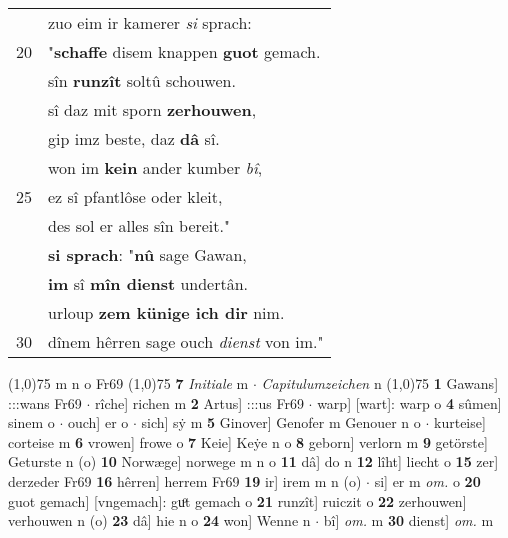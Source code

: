 \documentclass[8pt,a4paper,notitlepage]{article}
\begin{document}
\begin{table}[ht]
\begin{minipage}[t]{0.5\linewidth}
\begin{tabular}{rl}
 & zuo eim ir kamerer \textit{si} sprach:\\ 
20 & "\textbf{schaffe} disem knappen \textbf{guot} gemach.\\ 
 & sîn \textbf{runzît} soltû schouwen.\\ 
 & sî daz mit sporn \textbf{zerhouwen},\\ 
 & gip imz beste, daz \textbf{dâ} sî.\\ 
 & won im \textbf{kein} ander kumber \textit{bî},\\ 
25 & ez sî pfantlôse oder kleit,\\ 
 & des sol er alles sîn bereit."\\ 
 & \textbf{si sprach}: "\textbf{nû} sage Gawan,\\ 
 & \textbf{im} sî \textbf{mîn dienst} undertân.\\ 
 & urloup \textbf{zem künige ich dir} nim.\\ 
30 & dînem hêrren sage ouch \textit{dienst} von im."\\ 
\end{tabular}
\scriptsize
\line(1,0){75} \newline
m n o Fr69 \newline
\line(1,0){75} \newline
\textbf{7} \textit{Initiale} m   $\cdot$ \textit{Capitulumzeichen} n  \newline
\line(1,0){75} \newline
\textbf{1} Gawans] :::wans Fr69  $\cdot$ rîche] richen m \textbf{2} Artus] :::us Fr69  $\cdot$ warp] [wart]: warp o \textbf{4} sûmen] sinem o  $\cdot$ ouch] er o  $\cdot$ sich] sẏ m \textbf{5} Ginover] Genofer m Genouer n o  $\cdot$ kurteise] corteise m \textbf{6} vrowen] frowe o \textbf{7} Keie] Keẏe n o \textbf{8} geborn] verlorn m \textbf{9} getörste] Geturste n (o) \textbf{10} Norwæge] norwege m n o \textbf{11} dâ] do n \textbf{12} lîht] liecht o \textbf{15} zer] derzeder Fr69 \textbf{16} hêrren] herrem Fr69 \textbf{19} ir] irem m n (o)  $\cdot$ si] er m \textit{om.} o \textbf{20} guot gemach] [vngemach]: guͦt gemach o \textbf{21} runzît] ruiczit o \textbf{22} zerhouwen] verhouwen n (o) \textbf{23} dâ] hie n o \textbf{24} won] Wenne n  $\cdot$ bî] \textit{om.} m \textbf{30} dienst] \textit{om.} m \newline
\end{minipage}
\end{table}
\newpage
\end{document}

